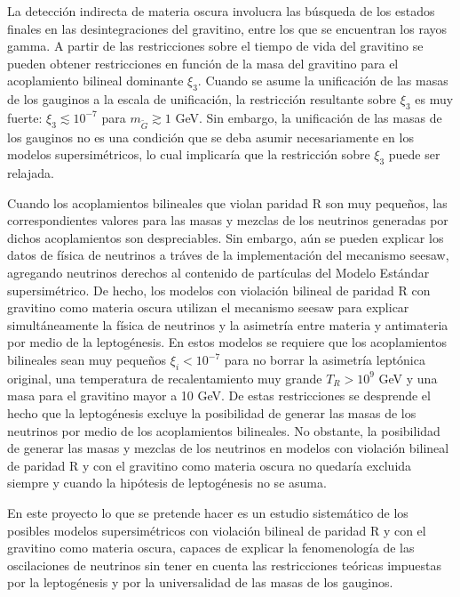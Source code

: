 La detección indirecta de materia oscura involucra las búsqueda de los estados finales en las desintegraciones del gravitino, entre los que se encuentran los rayos gamma. A partir de las restricciones sobre el tiempo de vida del gravitino se pueden obtener restricciones en función de la masa del gravitino para el acoplamiento bilineal dominante $\xi_3$. Cuando se asume la unificación de las masas de los gauginos a la escala de unificación, la restricción resultante sobre $\xi_3$ es muy fuerte: $\xi_3\lesssim 10^{-7}$ para $m_{\tilde G}\gtrsim 1$ GeV.  Sin embargo, la unificación de las masas de los gauginos no es una condición que se deba asumir necesariamente en los modelos supersimétricos, lo cual implicaría que la restricción sobre $\xi_3$ puede ser relajada.

Cuando los acoplamientos bilineales que violan paridad R son muy pequeños, las correspondientes valores para las masas y mezclas de los neutrinos generadas por dichos acoplamientos son despreciables. Sin embargo, aún se pueden explicar los datos de física de neutrinos a tráves de la implementación del mecanismo seesaw, agregando neutrinos derechos al contenido de partículas del Modelo Estándar supersimétrico. De hecho, los modelos con violación bilineal de paridad R con gravitino como materia oscura utilizan el mecanismo seesaw para explicar simultáneamente la física de neutrinos y la asimetría entre materia y antimateria por medio de la leptogénesis. En estos modelos se requiere que los acoplamientos bilineales sean muy pequeños $\xi_i<10^{-7}$ para no borrar la asimetría leptónica original, una temperatura de recalentamiento muy grande $T_R>10^9$ GeV y una masa para el gravitino mayor a 10 GeV. De estas restricciones se desprende el hecho que la leptogénesis excluye la posibilidad de generar las masas de los neutrinos por medio de los acoplamientos bilineales. No obstante, la posibilidad de generar las masas y mezclas de los neutrinos en modelos con violación bilineal de paridad R y con el gravitino como materia oscura no quedaría excluida siempre y cuando la hipótesis de leptogénesis no se asuma.

En este proyecto lo que se pretende hacer es un estudio sistemático de los posibles modelos supersimétricos con violación bilineal de paridad R y con el gravitino como materia oscura, capaces de explicar la fenomenología de las oscilaciones de neutrinos sin tener en cuenta las restricciones teóricas impuestas por la leptogénesis  y por la universalidad de las masas de los gauginos. 

